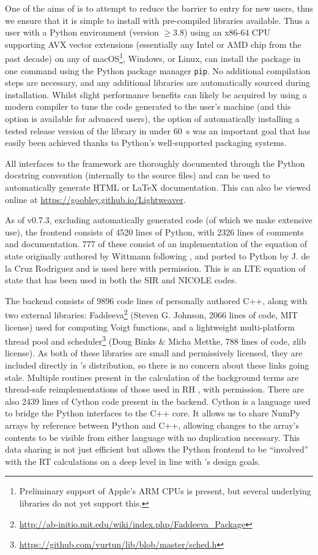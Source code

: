 One of the aims of \Lw{} is to attempt to reduce the barrier to entry for new users, thus we ensure that it is simple to install with pre-compiled libraries available.
Thus a user with a Python environment (version $\ge3.8$) using an x86-64 CPU supporting AVX vector extensions (essentially any Intel or AMD chip from the past decade) on any of macOS\footnote{Preliminary support of Apple's ARM CPUs is present, but several underlying libraries do not yet support this.}, Windows, or Linux, can install the package in one command using the Python package manager \texttt{pip}.
No additional compilation steps are necessary, and any additional libraries are automatically sourced during installation.
Whilst slight performance benefits can likely be acquired by using a modern compiler to tune the code generated to the user's machine (and this option is available for advanced users), the option of automatically installing a tested release version of the library in under \SI{60}{\second} was an important goal that has easily been achieved thanks to Python's well-supported packaging systems.

All interfaces to the framework are thoroughly documented through the Python docstring convention (internally to the source files) and can be used to automatically generate HTML or \LaTeX{} documentation.
This can also be viewed online at \url{https://goobley.github.io/Lightweaver}.

As of v0.7.3, excluding automatically generated code (of which we make extensive use), the \Lw{} frontend consists of 4520 lines of Python, with 2326 lines of comments and documentation.
777 of these consist of an implementation of the equation of state originally authored by Wittmann following \citet{Mihalas1978}, and ported to Python by J. de la Cruz Rodriguez and is used here with permission.
This is an LTE equation of state that has been used in both the SIR \citep{1992RuizCobo} and NICOLE \citep{Socas-Navarro2015} codes.

The backend consists of 9896 code lines of personally authored C++, along with two external libraries: Faddeeva\footnote{\url{http://ab-initio.mit.edu/wiki/index.php/Faddeeva_Package}} (Steven G. Johnson, 2066 lines of code, MIT license) used for computing Voigt functions, and a lightweight multi-platform thread pool and scheduler\footnote{\url{https://github.com/vurtun/lib/blob/master/sched.h}} (Doug Binks \& Micha Mettke, 788 lines of code, zlib license).
As both of these libraries are small and permissively licensed, they are included directly in \Lw{}'s distribution, so there is no concern about these links going stale.
Multiple routines present in the calculation of the background terms are thread-safe reimplementations of those used in RH \citep{Uitenbroek2001}, with permission.
There are also 2439 lines of Cython \citep{Behnel2011} code present in the backend.
Cython is a language used to bridge the Python interfaces to the C++ core.
It allows us to share NumPy \citep{Harris2020} arrays by reference between Python and C++, allowing changes to the array's contents to be visible from either language with no duplication necessary.
This data sharing is not just efficient but allows the Python frontend to be ``involved'' with the RT calculations on a deep level in line with \Lw{}'s design goals.

